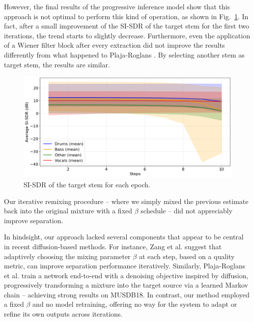 \documentclass{article}
\begin{document}
\begin{sloppy}
However, the final results of the progressive inference model show that this approach is not optimal to perform this kind of operation, as shown in Fig.~\ref{fig:add_sources}. In fact, after a small improvement of the SI-SDR of the target stem for the first two iterations, the trend starts to slightly decrease. Furthermore, even the application of a Wiener filter block after every extraction did not improve the results differently from what happened to Plaja-Roglans \cite{Plaja-Roglans_2022}.
By selecting another stem as target stem, the results are similar.


\begin{figure}[t]
  \centering
  \centerline{\includegraphics[width=\columnwidth]{images/si_sdr_results_add_sources.png}}
  \caption{SI-SDR of the target stem for each epoch.}
  \label{fig:add_sources}
\end{figure}

Our iterative remixing procedure – where we simply mixed the previous estimate back into the original mixture with a fixed $\beta$ schedule – did not appreciably improve separation.

In hindsight, our approach lacked several components that appear to be central in recent diffusion-based methods. For instance, Zang et al. \cite{Zang} suggest that adaptively choosing the mixing parameter $\beta$ at each step, based on a quality metric, can improve separation performance iteratively. Similarly, Plaja-Roglans et al. \cite{Plaja-Roglans_2022} train a network end-to-end with a denoising objective inspired by diffusion, progressively transforming a mixture into the target source via a learned Markov chain – achieving strong results on MUSDB18. In contrast, our method employed a fixed $\beta$ and no model retraining, offering no way for the system to adapt or refine its own outputs across iterations.


\end{sloppy}
\end{document}
